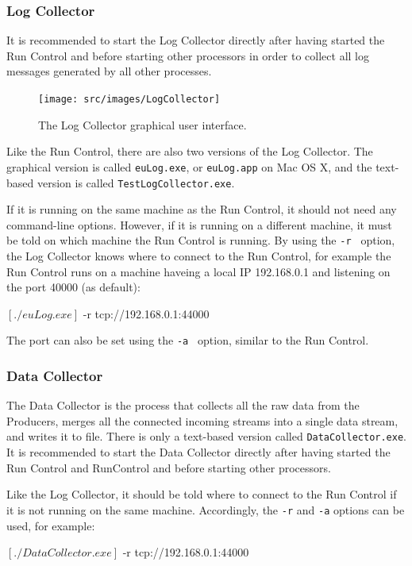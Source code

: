 \subsubsection{Log Collector}
\label{sec:logcollector}
It is recommended to start the Log Collector directly after having started the Run Control and before starting other processors in order to collect all log messages generated by all other processes.

\begin{figure}[htb]
  \begin{center}
    \texttt{[image: src/images/LogCollector]}
    \caption{The Log Collector graphical user interface.}
    \label{fig:LogCollector}
  \end{center}
\end{figure}

Like the Run Control, there are also two versions of the Log Collector.
The graphical version is called \texttt{euLog.exe}, or \texttt{euLog.app} on Mac OS X,
and the text-based version is called \texttt{TestLogCollector.exe}.

If it is running on the same machine as the Run Control, it should not need any command-line options.
However, if it is running on a different machine, it must be told on which machine the Run Control is running.
By using the \texttt{-r } option, the Log Collector knows where to connect to the Run Control, for example the Run Control runs on a machine haveing a local IP 192.168.0.1 and listening on the port 40000 (as default):
\begin{listing}[mybash]
$[./euLog.exe]$ -r tcp://192.168.0.1:44000
\end{listing}
The port can also be set using the \texttt{-a } option, similar to the Run Control.

\subsubsection{Data Collector}
\label{sec:datacollector}
The Data Collector is the process that collects all the raw data from the Producers,
merges all the connected incoming streams into a single data stream, and writes it to file.
There is only a text-based version called \texttt{DataCollector.exe}.
It is recommended to start the Data Collector directly after having started the Run Control and RunControl and before starting other processors.

Like the Log Collector, it should be told where to connect to the Run Control if it is not running on the same machine.
Accordingly, the \texttt{-r} and \texttt{-a} options can be used, for example:
\begin{listing}[mybash]
$[./DataCollector.exe]$ -r tcp://192.168.0.1:44000
\end{listing}

